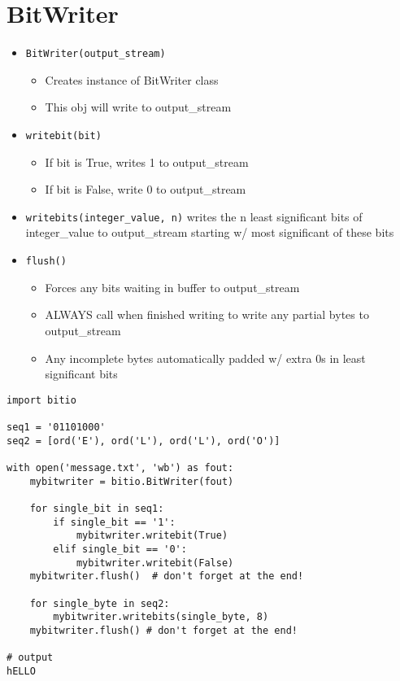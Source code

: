 \documentclass{article}
\begin{document}
\section{BitWriter}
    \begin{multicols}{2}
        \begin{itemize}
            \item \texttt{BitWriter(output\_stream)}
                \begin{itemize}
                    \item Creates instance of BitWriter class
                    \item This obj will write to output\_stream
                \end{itemize}
            \item \texttt{writebit(bit)}
                \begin{itemize}
                    \item If bit is True, writes 1 to output\_stream
                    \item If bit is False, write 0 to output\_stream
                \end{itemize}
            \item \texttt{writebits(integer\_value, n)} writes the n least significant bits of integer\_value to output\_stream starting w/ most significant of these bits
            \item \texttt{flush()}
                \begin{itemize}
                    \item Forces any bits waiting in buffer to output\_stream
                    \item ALWAYS call when finished writing to write any partial bytes to output\_stream
                    \item Any incomplete bytes automatically padded w/ extra 0s in least significant bits
                \end{itemize}
        \end{itemize}
    \end{multicols}
\begin{lstlisting}
import bitio

seq1 = '01101000'
seq2 = [ord('E'), ord('L'), ord('L'), ord('O')]

with open('message.txt', 'wb') as fout:
    mybitwriter = bitio.BitWriter(fout)
    
    for single_bit in seq1:
        if single_bit == '1':
            mybitwriter.writebit(True)
        elif single_bit == '0':
            mybitwriter.writebit(False)
    mybitwriter.flush()  # don't forget at the end!
    
    for single_byte in seq2:
        mybitwriter.writebits(single_byte, 8)
    mybitwriter.flush() # don't forget at the end!
    
# output
hELLO
\end{lstlisting}
\end{document}
